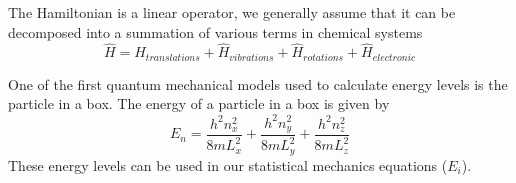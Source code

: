 \documentclass{article}
\begin{document}
The Hamiltonian is a linear operator, we generally assume that it can be decomposed into a summation of various terms in chemical systems
\begin{equation}
    \hat{H} = \hat{H}_{translations} + \hat{H}_{vibrations} + \hat{H}_{rotations} + \hat{H}_{electronic}
\end{equation}

One of the first quantum mechanical models used to calculate energy levels is the particle in a box. 
The energy of a particle in a box is given by  
\begin{equation}
    E_n = \frac{h^2n_x^2}{8mL_x^2}+ \frac{h^2n_y^2}{8mL_y^2}+ \frac{h^2n_z^2}{8mL_z^2}
\end{equation}
These energy levels can be used in our statistical mechanics equations ($E_i$). 
\end{document}

